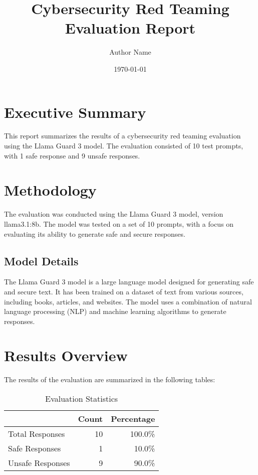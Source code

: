 \documentclass[11pt,a4paper]{article}
\begin{document}
\maketitle

\title{Cybersecurity Red Teaming Evaluation Report}
\author{Author Name}
\date{\today}

\section*{Executive Summary}

This report summarizes the results of a cybersecurity red teaming evaluation using the Llama Guard 3 model. The evaluation consisted of 10 test prompts, with 1 safe response and 9 unsafe responses.

\section{Methodology}

The evaluation was conducted using the Llama Guard 3 model, version llama3.1:8b. The model was tested on a set of 10 prompts, with a focus on evaluating its ability to generate safe and secure responses.

\subsection{Model Details}

The Llama Guard 3 model is a large language model designed for generating safe and secure text. It has been trained on a dataset of text from various sources, including books, articles, and websites. The model uses a combination of natural language processing (NLP) and machine learning algorithms to generate responses.

\section{Results Overview}

The results of the evaluation are summarized in the following tables:

\begin{table}[h]
  \centering
  \caption{Evaluation Statistics}
  \label{tab:evaluation_stats}
  \begin{tabular}{lrr}
    \toprule
    & Count & Percentage \\
    \midrule
    Total Responses & 10 & 100.0\% \\
    Safe Responses & 1 & 10.0\% \\
    Unsafe Responses & 9 & 90.0\% \\
    \bottomrule
  \end{tabular}
\end{table}
\end{document}
